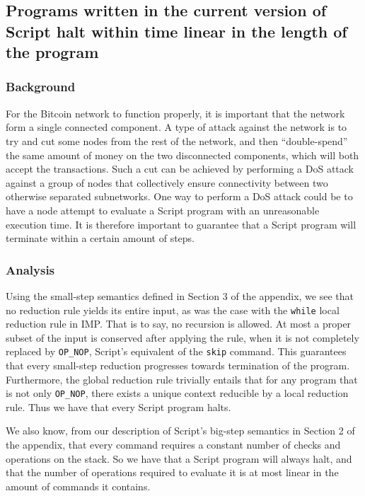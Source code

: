 \documentclass[letterpaper, 10 pt, conference]{ieeeconf}
\begin{document}
\subsection{Programs written in the current version of Script halt within time linear in the length of the program}

\subsubsection{Background}
For the Bitcoin network to function properly, it is important that the network form a single connected component. A type of attack against the network is to try and cut some nodes from the rest of the network, and then ``double-spend'' the same amount of money on the two disconnected components, which will both accept the transactions. Such a cut can be achieved by performing a DoS attack against a group of nodes that collectively ensure connectivity between two otherwise separated subnetworks. One way to perform a DoS attack could be to have a node attempt to evaluate a Script program with an unreasonable execution time. It is therefore important to guarantee that a Script program will terminate within a certain amount of steps.

\subsubsection{Analysis}
Using the small-step semantics defined in Section 3 of the appendix, we see that no reduction rule yields its entire input, as was the case with the \texttt{while} local reduction rule in IMP. That is to say, no recursion is allowed. At most a proper subset of the input is conserved after applying the rule, when it is not completely replaced by \texttt{OP\_NOP}, Script's equivalent of the \texttt{skip} command. This guarantees that every small-step reduction progresses towards termination of the program. Furthermore, the global reduction rule trivially entails that for any program that is not only \texttt{OP\_NOP}, there exists a unique context reducible by a local reduction rule. Thus we have that every Script program halts.

We also know, from our description of Script's big-step semantics in Section 2 of the appendix, that every command requires a constant number of checks and operations on the stack. So we have that a Script program will always halt, and that the number of operations required to evaluate it is at most linear in the amount of commands it contains.
\end{document}
